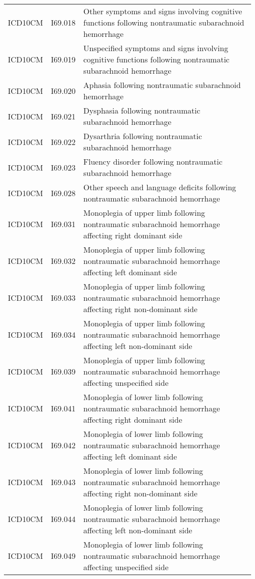 \begin{longtable}{p{}p{}p{}}
  ICD10CM & I69.018 & Other symptoms and signs involving cognitive functions following nontraumatic subarachnoid hemorrhage \\ 
  ICD10CM & I69.019 & Unspecified symptoms and signs involving cognitive functions following nontraumatic subarachnoid hemorrhage \\ 
  ICD10CM & I69.020 & Aphasia following nontraumatic subarachnoid hemorrhage \\ 
  ICD10CM & I69.021 & Dysphasia following nontraumatic subarachnoid hemorrhage \\ 
  ICD10CM & I69.022 & Dysarthria following nontraumatic subarachnoid hemorrhage \\ 
  ICD10CM & I69.023 & Fluency disorder following nontraumatic subarachnoid hemorrhage \\ 
  ICD10CM & I69.028 & Other speech and language deficits following nontraumatic subarachnoid hemorrhage \\ 
  ICD10CM & I69.031 & Monoplegia of upper limb following nontraumatic subarachnoid hemorrhage affecting right dominant side \\ 
  ICD10CM & I69.032 & Monoplegia of upper limb following nontraumatic subarachnoid hemorrhage affecting left dominant side \\ 
  ICD10CM & I69.033 & Monoplegia of upper limb following nontraumatic subarachnoid hemorrhage affecting right non-dominant side \\ 
  ICD10CM & I69.034 & Monoplegia of upper limb following nontraumatic subarachnoid hemorrhage affecting left non-dominant side \\ 
  ICD10CM & I69.039 & Monoplegia of upper limb following nontraumatic subarachnoid hemorrhage affecting unspecified side \\ 
  ICD10CM & I69.041 & Monoplegia of lower limb following nontraumatic subarachnoid hemorrhage affecting right dominant side \\ 
  ICD10CM & I69.042 & Monoplegia of lower limb following nontraumatic subarachnoid hemorrhage affecting left dominant side \\ 
  ICD10CM & I69.043 & Monoplegia of lower limb following nontraumatic subarachnoid hemorrhage affecting right non-dominant side \\ 
  ICD10CM & I69.044 & Monoplegia of lower limb following nontraumatic subarachnoid hemorrhage affecting left non-dominant side \\ 
  ICD10CM & I69.049 & Monoplegia of lower limb following nontraumatic subarachnoid hemorrhage affecting unspecified side \\ 

\end{longtable}
